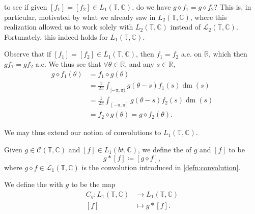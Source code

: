 \documentclass[notoc,notitlepage]{tufte-book}
\DeclareMathOperator{\dm}{dm}
\begin{document}
 to see if given $[f_1] = [f_2] \in L_1(\mathbb{T}, \mathbb{C})$,
do we have $g \diamond f_1 = g \diamond f_2$?
This is, in particular, motivated by what we already saw in $L_2(\mathbb{T}, \mathbb{C})$,
where this realization allowed us to work solely
with $L_2(\mathbb{T}, \mathbb{C})$ instead of $\mathcal{L}_2(\mathbb{T}, \mathbb{C})$.
Fortunately, this indeed holds for $L_1(\mathbb{T}, \mathbb{C})$.

Observe that if $[f_1] = [f_2] \in L_1(\mathbb{T}, \mathbb{C})$, then
$f_1 = f_2$ a.e. on $\mathbb{R}$, which then $gf_1 = gf_2$ a.e.
We thus see that $\forall \theta \in \mathbb{R}$, and any $s \in \mathbb{R}$,
\begin{align*}
  g \diamond f_1(\theta)
  &= f_1 \diamond g(\theta) \\
  &= \frac{1}{2\pi} \int_{[-\pi, \pi)} g(\theta - s) f_1(s) \dm(s) \\
  &= \frac{1}{2\pi} \int_{[-\pi, \pi]} g(\theta - s) f_2(s) \dm(s) \\
  &= f_2 \diamond g(\theta) = g \diamond f_2(\theta).
\end{align*}

We may thus extend our notion of convolutions to $L_1(\mathbb{T}, \mathbb{C})$.

\begin{defn}\label{defn:convolution_on_romanl_1_mathbb_t_mathbb_c_}
  Given $g \in \mathcal{C}(\mathbb{T}, \mathbb{C})$ and $[f] \in L_1(bt, \mathbb{C})$,
  we define the  of $g$ and $[f]$ to be
  \begin{equation*}
    g * [f] \coloneqq [g \diamond f],
  \end{equation*}
  where $g \diamond f \in \mathcal{L}_1(\mathbb{T}, \mathbb{C})$
  is the convolution introduced in \cref{defn:convolution}.
\end{defn}

\begin{defn}\label{defn:convolution_operator_with_kernel}
  We define the  with  $g$
  to be the map
  \begin{align*}
    C_g : L_1(\mathbb{T}, \mathbb{C}) &\to L_1(\mathbb{T}, \mathbb{C}) \\
                [f] &\mapsto g * [f].
  \end{align*}
\end{defn}
\end{document}
